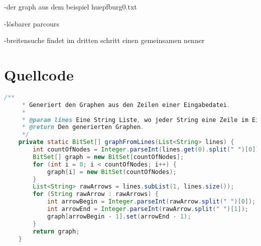 \documentclass[a4paper,10pt,ngerman]{scrartcl}
\begin{document}
    -der graph aus dem beispiel huepfburg0.txt

    -lösbarer parcours

    -breitensuche findet im dritten schritt einen gemeinsamen nenner



    \section{Quellcode}
    \label{sec:quellcode}
    \label{LastPage}
    \begin{lstlisting}[frame=single,language=Java,title=Methode graphFromLines,breaklines=true]
    /**
     * Generiert den Graphen aus den Zeilen einer Eingabedatei.
     *
     * @param lines Eine String Liste, wo jeder String eine Zeile im Eingabeformat ist.
     * @return Den generierten Graphen.
     */
    private static BitSet[] graphFromLines(List<String> lines) {
        int countOfNodes = Integer.parseInt(lines.get(0).split(" ")[0]);
        BitSet[] graph = new BitSet[countOfNodes];
        for (int i = 0; i < countOfNodes; i++) {
            graph[i] = new BitSet(countOfNodes);
        }
        List<String> rawArrows = lines.subList(1, lines.size());
        for (String rawArrow : rawArrows) {
            int arrowBegin = Integer.parseInt(rawArrow.split(" ")[0]);
            int arrowEnd = Integer.parseInt(rawArrow.split(" ")[1]);
            graph[arrowBegin - 1].set(arrowEnd - 1);
        }
        return graph;
    }
    \end{lstlisting}
\end{document}
